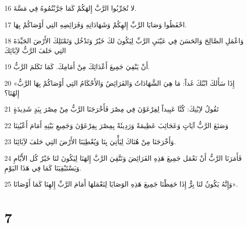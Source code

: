 \par 16 لا تُجَرِّبُوا الرَّبَّ إِلهَكُمْ كَمَا جَرَّبْتُمُوهُ فِي مَسَّةَ.
\par 17 احْفَظُوا وَصَايَا الرَّبِّ إِلهِكُمْ وَشَهَادَاتِهِ وَفَرَائِضِهِ التِي أَوْصَاكُمْ بِهَا.
\par 18 وَاعْمَلِ الصَّالِحَ وَالحَسَنَ فِي عَيْنَيِ الرَّبِّ لِيَكُونَ لكَ خَيْرٌ وَتَدْخُل وَتَمْتَلِكَ الأَرْضَ الجَيِّدَةَ التِي حَلفَ الرَّبُّ لآِبَائِكَ
\par 19 أَنْ يَنْفِيَ جَمِيعَ أَعْدَائِكَ مِنْ أَمَامِكَ. كَمَا تَكَلمَ الرَّبُّ.
\par 20 «إِذَا سَأَلكَ ابْنُكَ غَداً: مَا هِيَ الشَّهَادَاتُ وَالفَرَائِضُ وَالأَحْكَامُ التِي أَوْصَاكُمْ بِهَا الرَّبُّ إِلهُنَا؟
\par 21 تَقُولُ لاِبْنِكَ: كُنَّا عَبِيداً لِفِرْعَوْنَ فِي مِصْرَ فَأَخْرَجَنَا الرَّبُّ مِنْ مِصْرَ بِيَدٍ شَدِيدَةٍ
\par 22 وَصَنَعَ الرَّبُّ آيَاتٍ وَعَجَائِبَ عَظِيمَةً وَرَدِيئَةً بِمِصْرَ بِفِرْعَوْنَ وَجَمِيعِ بَيْتِهِ أَمَامَ أَعْيُنِنَا
\par 23 وَأَخْرَجَنَا مِنْ هُنَاكَ لِيَأْتِيَ بِنَا وَيُعْطِيَنَا الأَرْضَ التِي حَلفَ لآِبَائِنَا.
\par 24 فَأَمَرَنَا الرَّبُّ أَنْ نَعْمَل جَمِيعَ هَذِهِ الفَرَائِضَ وَنَتَّقِيَ الرَّبَّ إِلهَنَا لِيَكُونَ لنَا خَيْرٌ كُل الأَيَّامِ وَيَسْتَبْقِيَنَا كَمَا فِي هَذَا اليَوْمِ.
\par 25 وَإِنَّهُ يَكُونُ لنَا بِرٌّ إِذَا حَفِظْنَا جَمِيعَ هَذِهِ الوَصَايَا لِنَعْمَلهَا أَمَامَ الرَّبِّ إِلهِنَا كَمَا أَوْصَانَا».

\chapter{7}

